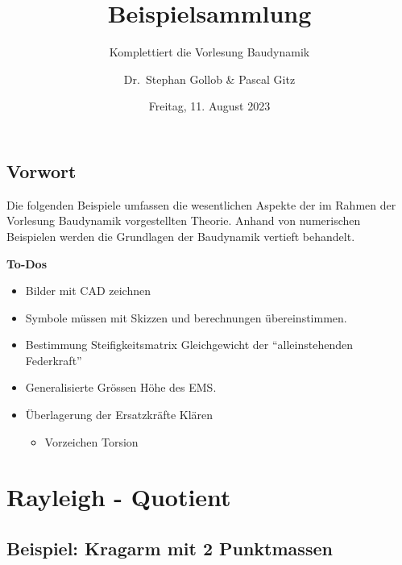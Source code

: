 \documentclass[
  letterpaper,
  DIV=11]{scrreprt}
\title{Beispielsammlung}
\subtitle{Komplettiert die Vorlesung Baudynamik}
\author{Dr.~Stephan Gollob \& Pascal Gitz}
\date{Freitag, 11. August 2023}
\providecommand{\tightlist}{%
  \setlength{\itemsep}{0pt}\setlength{\parskip}{0pt}}\usepackage{longtable,booktabs,array}
\renewcommand*\contentsname{Inhaltsverzeichnis}
\newcommand\contentsname{Inhaltsverzeichnis}
\begin{document}
\maketitle
\ifdefined\Shaded\renewenvironment{Shaded}{\begin{tcolorbox}[enhanced, breakable, sharp corners, interior hidden, boxrule=0pt, frame hidden, borderline west={3pt}{0pt}{shadecolor}]}{\end{tcolorbox}}\fi

\renewcommand*\contentsname{Inhaltsverzeichnis}
{
\hypersetup{linkcolor=}
\setcounter{tocdepth}{1}
\tableofcontents
}

\hypertarget{vorwort}{%
\chapter*{Vorwort}\label{vorwort}}


Die folgenden Beispiele umfassen die wesentlichen Aspekte der im Rahmen
der Vorlesung Baudynamik vorgestellten Theorie. Anhand von numerischen
Beispielen werden die Grundlagen der Baudynamik vertieft behandelt.

\textbf{To-Dos}

\begin{itemize}
\item
  Bilder mit CAD zeichnen
\item
  Symbole müssen mit Skizzen und berechnungen übereinstimmen.
\item
  Bestimmung Steifigkeitsmatrix Gleichgewicht der ``alleinstehenden
  Federkraft''
\item
  Generalisierte Grössen Höhe des EMS.
\item
  Überlagerung der Ersatzkräfte Klären

  \begin{itemize}
  \tightlist
  \item
    Vorzeichen Torsion
  \end{itemize}
\end{itemize}

\part{Rayleigh - Quotient}

\hypertarget{beispiel-kragarm-mit-2-punktmassen}{%
\chapter{Beispiel: Kragarm mit 2
Punktmassen}\label{beispiel-kragarm-mit-2-punktmassen}}
\end{document}
